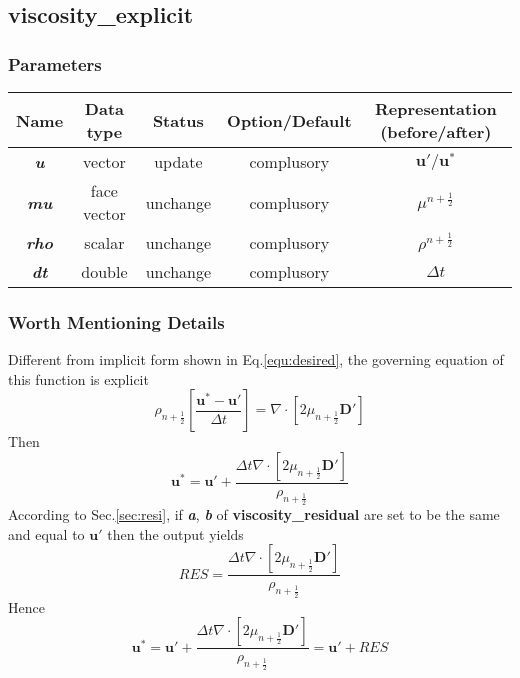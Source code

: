 \documentclass[a4paper]{article}
\newcommand{\func}[1]{\textbf{\textcolor{function}{#1}}}
\newcommand{\para}[1]{\textbf{\emph{\textcolor{para}{#1}}}}
\begin{document}
\subsection{\func{viscosity\_explicit}}
\subsubsection{Parameters}
\begin{center}
  \begin{tabular}{|c|c|c|c|c|}
    \hline
    Name & Data type & Status & Option/Default & Representation (before/after)\\[0.5ex]
    \hline\hline
    \rowcolor{output}\para{u} & vector & update & complusory & $ \mathbf{u}'/ \mathbf{u}^*$\\
    \hline
    \para{mu} & face vector & unchange & complusory & $ \mu^{n+ \frac{1}{2}}$\\
    \hline
    \para{rho} & scalar & unchange & complusory & $\rho^{n+ \frac{1}{2}}$\\
    \hline
    \para{dt} & double & unchange & complusory & $\Delta t$ \\
    \hline
  \end{tabular}
\end{center}

\subsubsection{Worth Mentioning Details}
Different from implicit form shown in Eq.\ref{equ:desired}, the governing equation of this function is explicit
\begin{equation}
  \rho_{n+ \frac{1}{2}}[ \frac{ \mathbf{u}^*- \mathbf{u}'}{\Delta t}] = \nabla\cdot [2\mu_{n+ \frac{1}{2}} \mathbf{D}']
\end{equation}
Then
\begin{equation}
  \mathbf{u}^* = \mathbf{u}' + \frac{\Delta t\nabla\cdot[2 \mu_{n+ \frac{1}{2}} \mathbf{D}']}{\rho_{n + \frac{1}{2}}} 
\end{equation}
According to Sec.\ref{sec:resi}, 
if \para{a}, \para{b} of \func{viscosity\_residual} are set to be the same and equal to $ \mathbf{u}'$ then the output yields
\begin{equation}
  RES = \frac{\Delta t\nabla\cdot[2 \mu_{n+ \frac{1}{2}} \mathbf{D}']}{\rho_{n + \frac{1}{2}}}
\end{equation}
Hence
\begin{equation}
  \mathbf{u}^* = \mathbf{u}' + \frac{\Delta t\nabla\cdot[2 \mu_{n+ \frac{1}{2}} \mathbf{D}']}{\rho_{n + \frac{1}{2}}}= \mathbf{u}'+ RES 
\end{equation}
\end{document}

